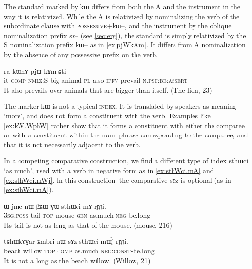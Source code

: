 \documentclass[oldfontcommands,oneside,a4paper,11pt]{article}
\newcommand{\ipa}[1]{{\phon #1}} %
\begin{document}
The standard marked by \ipa{kɯ} differs from both the A and the instrument in the way it is relativized. While the A is relativized by  nominalizing the verb of the subordinate clause with  \textsc{possessive}+\ipa{kɯ--}, and the instrument by the oblique nominalization prefix \ipa{sɤ--} (see \ref{sec:erg}), the standard is simply relativized by the S nominalization prefix  \ipa{kɯ--} as in   \ref{ex:pjWkAm}. It differs from A nominalization by  the absence of any possessive prefix on the verb.

 
 
\begin{exe}
\ex \label{ex:pjWkAm}
\gll
[\ipa{ɯʑo}  	\ipa{sɤz}  	\ipa{kɯ-wxti}]  	\ipa{rɯdaʁ}  	\ipa{ra}  	\ipa{kɯnɤ}  	\ipa{pjɯ-kɤm}  	\ipa{ɕti}  \\
it \textsc{comp} \textsc{nmlz}:S-big animal \textsc{pl} also \textsc{ipfv}-prevail \textsc{n.pst:be}:\textsc{assert} \\
\glt It also prevails over animals that are bigger than itself. (The lion, 23)
  \end{exe}


 
The marker   \ipa{kɯ} is not a typical  \textsc{index}. It is translated by speakers as meaning `more', and does not form a constituent with the verb. Examples like \ref{ex:kW.WphW} rather show that it forms a constituent with either the comparee or with a constituent within the noun phrase corresponding to the comparee, and that it is not necessarily adjacent to the verb.

In a competing comparative construction, we find a different type of index   \ipa{sthɯci} `as much', used with a verb in negative form as in \ref{ex:sthWci.mA} and \ref{ex:sthWci.mWj}. In this construction, the comparative \ipa{sɤz} is optional (as in \ref{ex:sthWci.mA}).
 
 
 \begin{exe}
\ex \label{ex:sthWci.mA}
\gll 
\ipa{ɯ-jme}  	\ipa{nɯ}  	\ipa{βʑɯ}  	\ipa{ɣɯ}  	\ipa{sthɯci}  	\ipa{mɤ-rɲɟi.}  \\
\textsc{3sg.poss}-tail \textsc{top} mouse \textsc{gen} as.much \textsc{neg}-be.long \\
\glt Its tail is not as long as that of the mouse.  (mouse, 216)
 \end{exe}
 
  \begin{exe}
\ex \label{ex:sthWci.mWj}
\gll 
 \ipa{tɕhɯkɤɣar}  	\ipa{ʑmbri}  	\ipa{nɯ}  	\ipa{sɤz}  	\ipa{sthɯci}  	\ipa{mɯ́j-rɲɟi.}  \\
beach willow \textsc{top} \textsc{comp} as.much \textsc{neg:const}-be.long \\
\glt It is not a long as the beach willow. (Willow, 21)
  \end{exe}
  
\end{document}
